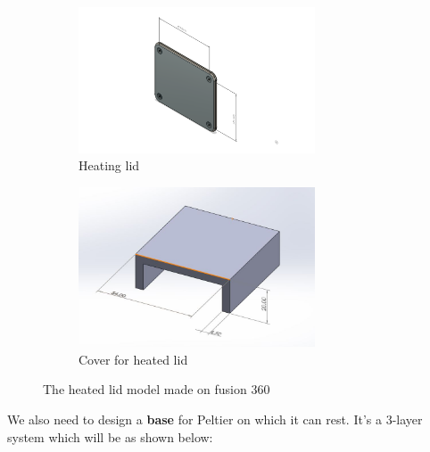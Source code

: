 \documentclass{article}
\begin{document}
\begin{figure}[htp]
    \centering
    \begin{subfigure}[b]{0.4\textwidth}
    \centering
    \includegraphics[width=7cm]{Images/Heatedlid1.png}
    \caption{Heating lid}
    \end{subfigure}
    \hfill
    \begin{subfigure}[b]{0.5\textwidth}
    \centering
    \includegraphics[width=7cm]{Images/heatinglid2.jpeg}
    \caption{Cover for heated lid}
    \end{subfigure}
    \caption{The heated lid model made on fusion 360}
    \label{fig:galaxy}
\end{figure}

We also need to design a \textbf{base} for Peltier on which it can rest. It's a 3-layer system which will be as shown below:
\end{document}
